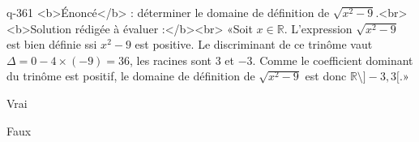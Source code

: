 \begin{truefalse}{q-361}
<b>Énoncé</b> : déterminer le domaine de définition de $\sqrt{x^2-9}$.<br> <b>Solution rédigée à évaluer :</b><br>  «Soit $x\in\mathbb{R}$.  L'expression $\sqrt{x^2-9}$ est bien définie ssi $x^2-9$ est positive. Le discriminant de ce trinôme vaut $\Delta = 0-4\times(-9)=36$, les racines sont $3$ et $-3$. Comme le coefficient dominant du trinôme est positif, le domaine de définition de $\sqrt{x^2-9}$ est donc $\mathbb{R}\setminus ]-3,3[$.»
\item* Vrai
\item Faux
\end{truefalse}

